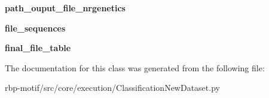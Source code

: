 \begin{DoxyCompactItemize}
\item 
\hypertarget{classsrc_1_1core_1_1execution_1_1ClassificationNewDataset_1_1ClassificationNewDataset_aff042a43fd25c9e79792888df6b109f3}{{\bfseries path\-\_\-ouput\-\_\-file\-\_\-nrgenetics}}\label{classsrc_1_1core_1_1execution_1_1ClassificationNewDataset_1_1ClassificationNewDataset_aff042a43fd25c9e79792888df6b109f3}

\item 
\hypertarget{classsrc_1_1core_1_1execution_1_1ClassificationNewDataset_1_1ClassificationNewDataset_a776de1a1ed2e4da85a4e438f5a42756d}{{\bfseries file\-\_\-sequences}}\label{classsrc_1_1core_1_1execution_1_1ClassificationNewDataset_1_1ClassificationNewDataset_a776de1a1ed2e4da85a4e438f5a42756d}

\item 
\hypertarget{classsrc_1_1core_1_1execution_1_1ClassificationNewDataset_1_1ClassificationNewDataset_aeed4cf4a8a65d67c4b1fec794248101d}{{\bfseries final\-\_\-file\-\_\-table}}\label{classsrc_1_1core_1_1execution_1_1ClassificationNewDataset_1_1ClassificationNewDataset_aeed4cf4a8a65d67c4b1fec794248101d}

\end{DoxyCompactItemize}


The documentation for this class was generated from the following file\-:\begin{DoxyCompactItemize}
\item 
rbp-\/motif/src/core/execution/Classification\-New\-Dataset.\-py\end{DoxyCompactItemize}
